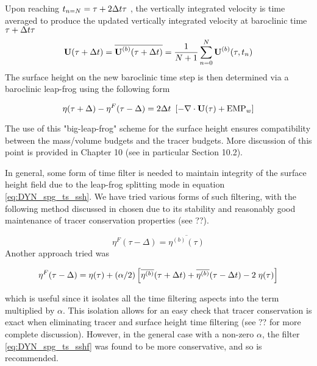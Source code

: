 \documentclass[../tex_main/NEMO_manual]{subfiles}
\begin{document}
{Upon reaching $t_{n=N} = \tau + 2\Delta t \tau$ ,
the vertically integrated velocity is time averaged to produce the updated vertically integrated velocity at
baroclinic time $\tau + \Delta t \tau$ 
\begin{equation} \label{eq:DYN_spg_ts_u}
\textbf{U}(\tau+\Delta t) = \overline{\textbf{U}^{(b)}(\tau+\Delta t)} 
 	= \frac{1}{N+1} \sum\limits_{n=0}^N\textbf{U}^{(b)}(\tau,t_{n})
\end{equation}
The surface height on the new baroclinic time step is then determined via a baroclinic leap-frog using
the following form 

\begin{equation} \label{eq:DYN_spg_ts_ssh}
\eta(\tau+\Delta) - \eta^{F}(\tau-\Delta) = 2\Delta t \ \left[ - \nabla \cdot \textbf{U}(\tau) + \text{EMP}_w \right]  
\end{equation}

The use of this "big-leap-frog" scheme for the surface height ensures compatibility between
the mass/volume budgets and the tracer budgets.
More discussion of this point is provided in Chapter 10 (see in particular Section 10.2). 
 
In general, some form of time filter is needed to maintain integrity of the surface height field due to
the leap-frog splitting mode in equation \autoref{eq:DYN_spg_ts_ssh}.
We have tried various forms of such filtering,
with the following method discussed in \cite{Griffies_al_MWR01} chosen due to
its stability and reasonably good maintenance of tracer conservation properties (see ??).

\begin{equation} \label{eq:DYN_spg_ts_sshf}
\eta^{F}(\tau-\Delta) =  \overline{\eta^{(b)}(\tau)} 
\end{equation}
Another approach tried was 

\begin{equation} \label{eq:DYN_spg_ts_sshf2}
\eta^{F}(\tau-\Delta) = \eta(\tau) 
	+ (\alpha/2) \left[\overline{\eta^{(b)}}(\tau+\Delta t)
				    + \overline{\eta^{(b)}}(\tau-\Delta t) -2 \;\eta(\tau) \right]
\end{equation}

which is useful since it isolates all the time filtering aspects into the term multiplied by $\alpha$.
This isolation allows for an easy check that tracer conservation is exact when
eliminating tracer and surface height time filtering (see ?? for more complete discussion).
However, in the general case with a non-zero $\alpha$,
the filter \autoref{eq:DYN_spg_ts_sshf} was found to be more conservative, and so is recommended. 

}            %
\end{document}
